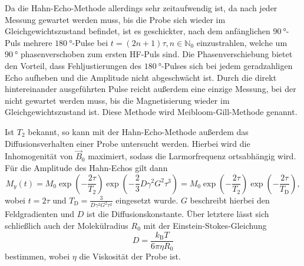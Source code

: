 Da die Hahn-Echo-Methode allerdings sehr zeitaufwendig ist, da nach jeder Messung gewartet werden muss, bis die Probe sich wieder im Gleichgewichtszustand befindet, ist es geschickter, nach dem anfänglichen $\SI{90}{\degree}$-Puls mehrere $\SI{180}{\degree}$-Pulse bei $t = (2n+1)\tau, n \in \mathbb{N}_0$ einzustrahlen, welche um $\SI{90}{\degree}$ phasenverschoben zum ersten HF-Puls sind. Die Phasenverschiebung bietet den Vorteil, dass Fehljustierungen des $\SI{180}{\degree}$-Pulses sich bei jedem geradzahligen Echo aufheben und die Amplitude nicht abgeschwächt ist. Durch die direkt hintereinander ausgeführten Pulse reicht außerdem eine einzige Messung, bei der nicht gewartet werden muss, bis die Magnetisierung wieder im Gleichgewichtszustand ist. Diese Methode wird Meibloom-Gill-Methode genannt.

Ist $T_2$ bekannt, so kann mit der Hahn-Echo-Methode außerdem das Diffusionsverhalten einer Probe untersucht werden. Hierbei wird die Inhomogenität von $\vec{B}_0$ maximiert, sodass die Larmorfrequenz ortsabhängig wird. Für die Amplitude des Hahn-Echos gilt dann
\begin{equation}
  M_y (t) = M_0 \exp (-\frac{2\tau}{T_2}) \exp (-\frac{2}{3} D \gamma^2 G^2 \tau^3) = M_0 \exp (-\frac{2\tau}{T_2}) \exp (-\frac{2\tau}{T_\mathrm{D}}),
  \label{eq:D}
\end{equation}
wobei $t = 2\tau$ und $T_\mathrm{D} = \frac{3}{D \gamma^2 G^2 \tau^2}$ eingesetzt wurde. $G$ beschreibt hierbei den Feldgradienten und $D$ ist die Diffusionskonstante. Über letztere lässt sich schließlich auch der Molekülradius $R_0$ mit der Einstein-Stokes-Gleichung
\begin{equation}
  D = \frac{k_\mathrm{B} T}{6\pi\eta R_0}
  \label{eq:R0}
\end{equation}
bestimmen, wobei $\eta$ die Viskosität der Probe ist.
